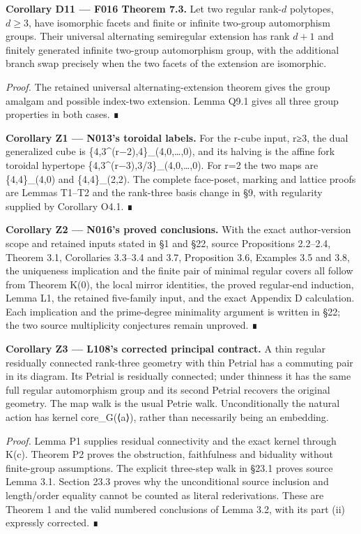 \documentclass[
  10pt,
  letterpaper,
]{article}
\begin{document}
\textbf{Corollary D11 --- F016 Theorem 7.3.} Let two regular rank-\(d\)
polytopes, \(d\ge3\), have isomorphic facets and finite or infinite
two-group automorphism groups. Their universal alternating semiregular
extension has rank \(d+1\) and finitely generated infinite two-group
automorphism group, with the additional branch swap precisely when the
two facets of the extension are isomorphic.

\emph{Proof.} The retained universal alternating-extension theorem gives
the group amalgam and possible index-two extension. Lemma Q9.1 gives all
three group properties in both cases. ∎

\textbf{Corollary Z1 --- N013's toroidal labels.} For the r-cube input,
r≥3, the dual generalized cube is \{4,3\^{}(r−2),4\}\_(4,0,\ldots,0),
and its halving is the affine fork toroidal hypertope
\{4,3\^{}(r−3),3/3\}\_(4,0,\ldots,0). For r=2 the two maps are
\{4,4\}\_(4,0) and \{4,4\}\_(2,2). The complete face-poset, marking and
lattice proofs are Lemmas T1--T2 and the rank-three basis change in §9,
with regularity supplied by Corollary O4.1. ∎

\textbf{Corollary Z2 --- N016's proved conclusions.} With the exact
author-version scope and retained inputs stated in §1 and §22, source
Propositions 2.2--2.4, Theorem 3.1, Corollaries 3.3--3.4 and 3.7,
Proposition 3.6, Examples 3.5 and 3.8, the uniqueness implication and
the finite pair of minimal regular covers all follow from Theorem K(0),
the local mirror identities, the proved regular-end induction, Lemma L1,
the retained five-family input, and the exact Appendix D calculation.
Each implication and the prime-degree minimality argument is written in
§22; the two source multiplicity conjectures remain unproved. ∎

\textbf{Corollary Z3 --- L108's corrected principal contract.} A thin
regular residually connected rank-three geometry with thin Petrial has a
commuting pair in its diagram. Its Petrial is residually connected;
under thinness it has the same full regular automorphism group and its
second Petrial recovers the original geometry. The map walk is the usual
Petrie walk. Unconditionally the natural action has kernel core\_G(⟨a⟩),
rather than necessarily being an embedding.

\emph{Proof.} Lemma P1 supplies residual connectivity and the exact
kernel through K(c). Theorem P2 proves the obstruction, faithfulness and
biduality without finite-group assumptions. The explicit three-step walk
in §23.1 proves source Lemma 3.1. Section 23.3 proves why the
unconditional source inclusion and length/order equality cannot be
counted as literal rederivations. These are Theorem 1 and the valid
numbered conclusions of Lemma 3.2, with its part (ii) expressly
corrected. ∎
\end{document}

